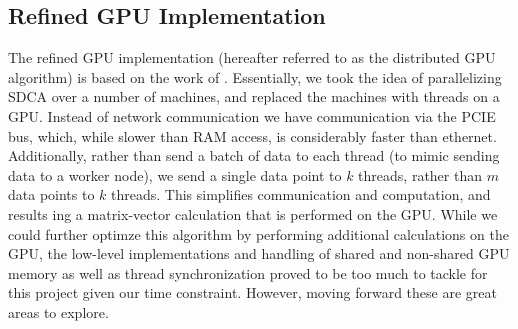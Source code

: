 \documentclass{article}
\begin{document}
\subsection{Refined GPU Implementation}
The refined GPU implementation (hereafter referred to as the distributed GPU
algorithm) is based on the work of \cite{yang2013trading}. Essentially, we took
the idea of parallelizing SDCA over a number of machines, and replaced the
machines with threads on a GPU. Instead of network communication we have
communication via the PCIE bus, which, while slower than RAM access, is
considerably faster than ethernet. Additionally, rather than send a batch of
data to each thread (to mimic sending data to a worker node), we send a single
data point to $k$ threads, rather than $m$ data points to $k$ threads. This
simplifies communication and computation, and results ing a matrix-vector
calculation that is performed on the GPU. While we could further optimze this
algorithm by performing additional calculations on the GPU, the low-level
implementations and handling of shared and non-shared GPU memory as well as
thread synchronization proved to be too much to tackle for this project given
our time constraint. However, moving forward these are great areas to explore.
\end{document}
